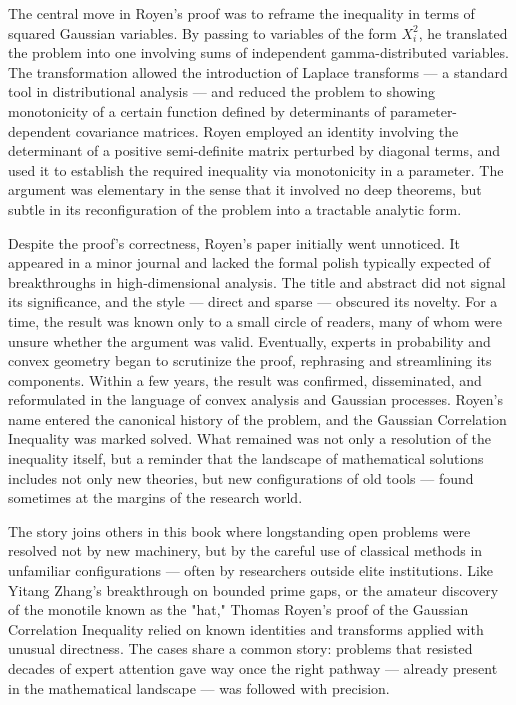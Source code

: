 The central move in Royen's proof was to reframe the inequality in terms of squared Gaussian variables. By passing to variables of the form \( X_i^2 \), he translated the problem into one involving sums of independent gamma-distributed variables. The transformation allowed the introduction of Laplace transforms — a standard tool in distributional analysis — and reduced the problem to showing monotonicity of a certain function defined by determinants of parameter-dependent covariance matrices. Royen employed an identity involving the determinant of a positive semi-definite matrix perturbed by diagonal terms, and used it to establish the required inequality via monotonicity in a parameter. The argument was elementary in the sense that it involved no deep theorems, but subtle in its reconfiguration of the problem into a tractable analytic form.

Despite the proof’s correctness, Royen’s paper initially went unnoticed. It appeared in a minor journal and lacked the formal polish typically expected of breakthroughs in high-dimensional analysis. The title and abstract did not signal its significance, and the style — direct and sparse — obscured its novelty. For a time, the result was known only to a small circle of readers, many of whom were unsure whether the argument was valid. Eventually, experts in probability and convex geometry began to scrutinize the proof, rephrasing and streamlining its components. Within a few years, the result was confirmed, disseminated, and reformulated in the language of convex analysis and Gaussian processes. Royen’s name entered the canonical history of the problem, and the Gaussian Correlation Inequality was marked solved. What remained was not only a resolution of the inequality itself, but a reminder that the landscape of mathematical solutions includes not only new theories, but new configurations of old tools — found sometimes at the margins of the research world.

\begin{commentary}
The story joins others in this book where longstanding open problems were resolved not by new machinery, but by the careful use of classical methods in unfamiliar configurations — often by researchers outside elite institutions. Like Yitang Zhang's breakthrough on bounded prime gaps, or the amateur discovery of the monotile known as the "hat," Thomas Royen's proof of the Gaussian Correlation Inequality relied on known identities and transforms applied with unusual directness. The cases share a common story: problems that resisted decades of expert attention gave way once the right pathway — already present in the mathematical landscape — was followed with precision.
\end{commentary}

